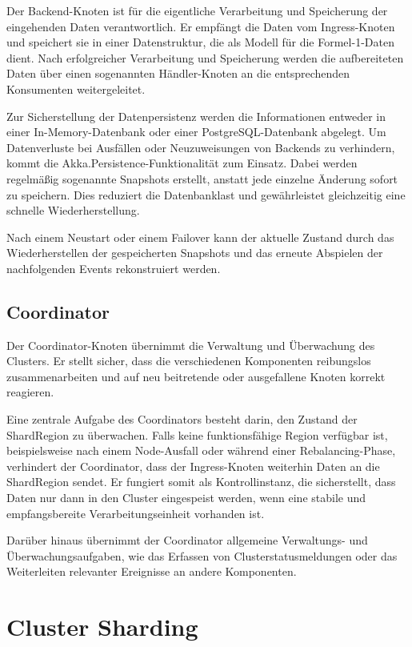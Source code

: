 Der Backend-Knoten ist für die eigentliche Verarbeitung und Speicherung der eingehenden Daten verantwortlich.
Er empfängt die Daten vom Ingress-Knoten und speichert sie in einer Datenstruktur, die als Modell für die Formel-1-Daten dient.
Nach erfolgreicher Verarbeitung und Speicherung werden die aufbereiteten Daten über einen sogenannten Händler-Knoten an die entsprechenden Konsumenten weitergeleitet.

Zur Sicherstellung der Datenpersistenz werden die Informationen entweder in einer In-Memory-Datenbank oder einer PostgreSQL-Datenbank abgelegt.
Um Datenverluste bei Ausfällen oder Neuzuweisungen von Backends zu verhindern, kommt die Akka.Persistence-Funktionalität zum Einsatz.
Dabei werden regelmäßig sogenannte Snapshots erstellt, anstatt jede einzelne Änderung sofort zu speichern.
Dies reduziert die Datenbanklast und gewährleistet gleichzeitig eine schnelle Wiederherstellung.

Nach einem Neustart oder einem Failover kann der aktuelle Zustand durch das Wiederherstellen der gespeicherten Snapshots und das erneute Abspielen der nachfolgenden Events rekonstruiert werden.

\subsection{Coordinator}

Der Coordinator-Knoten übernimmt die Verwaltung und Überwachung des Clusters.
Er stellt sicher, dass die verschiedenen Komponenten reibungslos zusammenarbeiten und auf neu beitretende oder ausgefallene Knoten korrekt reagieren.

Eine zentrale Aufgabe des Coordinators besteht darin, den Zustand der ShardRegion zu überwachen.
Falls keine funktionsfähige Region verfügbar ist, beispielsweise nach einem Node-Ausfall oder während einer Rebalancing-Phase, verhindert der Coordinator, dass der Ingress-Knoten weiterhin Daten an die ShardRegion sendet.
Er fungiert somit als Kontrollinstanz, die sicherstellt, dass Daten nur dann in den Cluster eingespeist werden, wenn eine stabile und empfangsbereite Verarbeitungseinheit vorhanden ist.

Darüber hinaus übernimmt der Coordinator allgemeine Verwaltungs- und Überwachungsaufgaben, wie das Erfassen von Clusterstatusmeldungen oder das Weiterleiten relevanter Ereignisse an andere Komponenten.

\section{Cluster Sharding}


